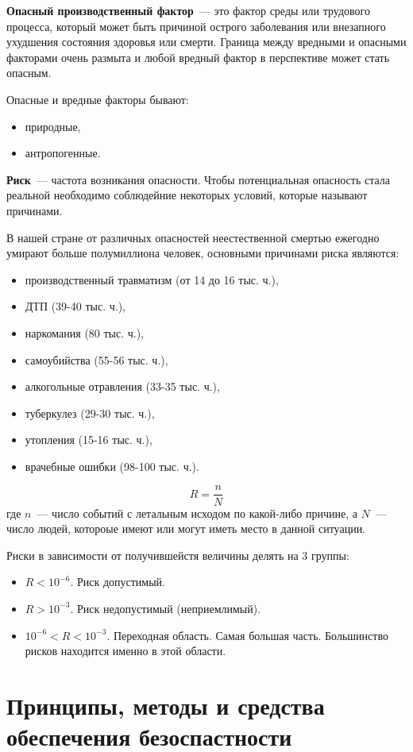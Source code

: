 \textbf{Опасный производственный фактор}~--- это фактор среды или трудового процесса, который может быть причиной острого заболевания или внезапного ухудшения состояния здоровья или смерти. Граница между вредными и опасными факторами очень размыта и любой вредный фактор в перспективе может стать опасным.

Опасные и вредные факторы бывают:
\begin{itemize}
	\item природные,
	\item антропогенные.
\end{itemize}

\textbf{Риск}~--- частота возникания опасности. Чтобы потенциальная опасность стала реальной необходимо соблюдейние некоторых условий, которые называют причинами.

В нашей стране от различных опасностей неестественной смертью ежегодно умирают больше полумиллиона человек, основными причинами риска являются:
\begin{itemize}
	\item производственный травматизм (от 14 до 16 тыс. ч.),
	\item ДТП (39-40 тыс. ч.),
	\item наркомания (80 тыс. ч.),
	\item самоубийства (55-56 тыс. ч.),
	\item алкогольные отравления (33-35 тыс. ч.),
	\item туберкулез (29-30 тыс. ч.),
	\item утопления (15-16 тыс. ч.),
	\item врачебные ошибки (98-100 тыс. ч.).
\end{itemize}
$$
	R =\frac{n}{N}
$$
где $n$~--- число событий с летальным исходом по какой-либо причине, а $N$~--- число людей, котороые имеют или могут иметь место в данной ситуации.

Риски в зависимости от получившейстя величины делять на 3 группы:
\begin{itemize}
	\item $R<10^{-6}$. Риск допустимый.
	\item $R>10^{-3}$. Риск недопустимый (неприемлимый).
	\item $10^{-6}<R<10^{-3}$. Переходная область. Самая большая часть. Большинство рисков находится именно в этой области.
\end{itemize}

\section{Принципы, методы и средства обеспечения безоспастности}
